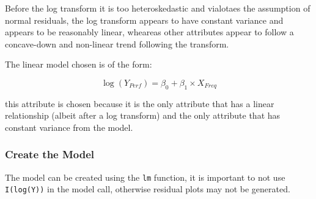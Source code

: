 \documentclass[12pt]{article}
\newenvironment{Shaded}{\begin{snugshade}}{\end{snugshade}}
\newcommand{\CommentTok}[1]{\textcolor[rgb]{0.56,0.35,0.01}{\textit{#1}}}
\newcommand{\DataTypeTok}[1]{\textcolor[rgb]{0.13,0.29,0.53}{#1}}
\newcommand{\DecValTok}[1]{\textcolor[rgb]{0.00,0.00,0.81}{#1}}
\newcommand{\FloatTok}[1]{\textcolor[rgb]{0.00,0.00,0.81}{#1}}
\newcommand{\KeywordTok}[1]{\textcolor[rgb]{0.13,0.29,0.53}{\textbf{#1}}}
\newcommand{\NormalTok}[1]{#1}
\newcommand{\OperatorTok}[1]{\textcolor[rgb]{0.81,0.36,0.00}{\textbf{#1}}}
\newcommand{\StringTok}[1]{\textcolor[rgb]{0.31,0.60,0.02}{#1}}
\begin{document}
Before the log transform it is too heteroskedastic and vialotaes the
assumption of normal residuals, the log transform appears to have
constant variance and appears to be reasonably linear, wheareas other
attributes appear to follow a concave-down and non-linear trend
following the transform.

The linear model chosen is of the form:

\[
\log{\left( Y_{Perf}\right)} = \beta_0 + \beta_1 \times X_{Freq}
\]

this attribute is chosen because it is the only attribute that has a
linear relationship (albeit after a log transform) and the only
attribute that has constant variance from the model.

\hypertarget{create-the-model}{%
\subsubsection{Create the Model}\label{create-the-model}}

The model can be created using the \texttt{lm} function, it is important
to not use \texttt{I(log(Y))} in the model call, otherwise residual
plots may not be generated.

\begin{Shaded}
\end{Shaded}
\end{document}
